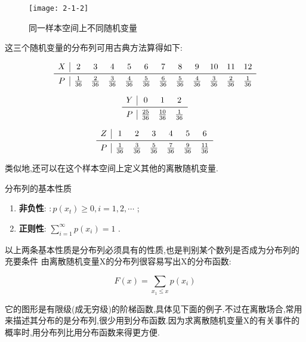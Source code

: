 \begin{figure}
	\centering
	\texttt{[image: 2-1-2]}
	\caption{同一样本空间上不同随机变量}
	\label{fig:2.1.2}
\end{figure}

这三个随机变量的分布列可用古典方法算得如下:

\[
\begin{array}{c|ccccccccccc}
X     & 2     & 3     & 4     & 5     & 6     & 7 & 8 & 9 & 10 & 11 & 12 \\\midrule
P     &  \frac{1}{36}  &  \frac{2}{36}  &  \frac{3}{36}  &  \frac{4}{36}  &  \frac{5}{36}  &  \frac{6}{36}  &  \frac{5}{36}  &  \frac{4}{36}  &  \frac{3}{36}  &  \frac{2}{36}  &  \frac{1}{36}  \\
\end{array}
\]

\[
\begin{array}{c|ccc}
 Y  & 0     & 1     & 2 \\\midrule
 P  &  \frac{25}{36}  &  \frac{10}{36}  &  \frac{1}{36}  \\
\end{array}
\]	

\[
\begin{array}{c|cccccc}
 Z  & 1 & 2     & 3     & 4     & 5     & 6 \\\midrule
 P  &  \frac{1}{36}  &  \frac{3}{36}  &  \frac{5}{36}  &  \frac{7}{36}  &  \frac{9}{36}  &  \frac{11}{36}  \\
\end{array}
\]

类似地,还可以在这个样本空间上定义其他的离散随机变量.

分布列的基本性质

\begin{enumerate}
\item \textbf{非负性}: $ : p\left(x_{t}\right) \geqslant 0, i=1,2, \cdots $ ;
\item \textbf{正则性}: $ \sum_{i=1}^{\infty} p\left(x_{i}\right)=1 $ .
\end{enumerate}

以上两条基本性质是分布列必须具有的性质,也是判别某个数列是否成为分布列的充要条件
由离散随机变量X的分布列很容易写出X的分布函数:

\[ 
F(x)=\sum_{x_{1} \leqslant x} p\left(x_{i}\right)
\]

它的图形是有限级(成无穷级)的阶梯函数,具体见下面的例子.不过在离散场合,常用来描述其分布的是分布列,很少用到分布函数.因为求离散随机变量X的有关事件的概率时,用分布列比用分布函数来得更方便.

